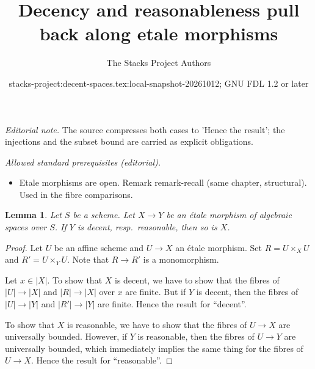 \documentclass{stacks-project}
\title{Decency and reasonableness pull back along etale morphisms}
\author{The Stacks Project Authors}
\date{stacks-project:decent-spaces.tex:local-snapshot-20261012; GNU FDL 1.2 or later}
\theoremstyle{plain}
\newtheorem{lemma}[subsection]{Lemma}
\theoremstyle{definition}
\theoremstyle{remark}
\numberwithin{equation}{subsection}
\begin{document}
\maketitle
\noindent\textit{Editorial note.} The source compresses both cases to 'Hence the result'; the injections and the subset bound are carried as explicit obligations.\par\medskip
\noindent\textit{Allowed standard prerequisites (editorial).}\begin{itemize}
\item Etale morphisms are open. Remark remark-recall (same chapter, structural). Used in the fibre comparisons.
\end{itemize}\medskip
\begin{lemma}
\label{lemma-etale-named-properties}
Let $S$ be a scheme. Let $X \to Y$ be an \'etale morphism of
algebraic spaces over $S$. If $Y$ is decent, resp.\ reasonable,
then so is $X$.
\end{lemma}

\begin{proof}
Let $U$ be an affine scheme and $U \to X$ an \'etale morphism.
Set $R = U \times_X U$ and $R' = U \times_Y U$. Note that
$R \to R'$ is a monomorphism.

\medskip\noindent
Let $x \in |X|$. To show that $X$ is decent, we have to show that
the fibres of $|U| \to |X|$ and $|R| \to |X|$ over $x$ are finite.
But if $Y$ is decent, then the fibres of $|U| \to |Y|$ and
$|R'| \to |Y|$ are finite. Hence the result for ``decent''.

\medskip\noindent
To show that $X$ is reasonable, we have to show that the fibres of
$U \to X$ are universally bounded. However, if $Y$ is reasonable,
then the fibres of $U \to Y$ are universally bounded, which immediately
implies the same thing for the fibres of $U \to X$.
Hence the result for ``reasonable''.
\end{proof}
\end{document}
